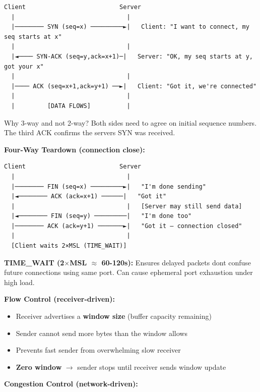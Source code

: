 \documentclass[11pt]{article}
\providecommand{\tightlist}{\setlength{\itemsep}{1pt}\setlength{\parskip}{0pt}}
\begin{document}
\setcodelang{}

\begin{verbatim}
Client                          Server
  |                               |
  |──────── SYN (seq=x) ─────────►|   Client: "I want to connect, my seq starts at x"
  |                               |
  |◄──── SYN-ACK (seq=y,ack=x+1)─|   Server: "OK, my seq starts at y, got your x"
  |                               |
  |──── ACK (seq=x+1,ack=y+1) ──►|   Client: "Got it, we're connected"
  |                               |
  |         [DATA FLOWS]          |
\end{verbatim}

Why 3-way and not 2-way? Both sides need to agree on initial sequence numbers. The third ACK confirms the server\textquotesingle s SYN was received.

\textbf{Four-Way Teardown (connection close):}

\setcodelang{}

\begin{verbatim}
Client                          Server
  |                               |
  |──────── FIN (seq=x) ─────────►|   "I'm done sending"
  |◄──────── ACK (ack=x+1) ──────|   "Got it"
  |                               |   [Server may still send data]
  |◄──────── FIN (seq=y) ─────────|   "I'm done too"
  |──────── ACK (ack=y+1) ───────►|   "Got it — connection closed"
  |                               |
  [Client waits 2×MSL (TIME_WAIT)]
\end{verbatim}

\textbf{TIME\_WAIT (2\(\times\)MSL \(\approx\) 60-120s):} Ensures delayed packets don\textquotesingle t confuse future connections using same port. Can cause ephemeral port exhaustion under high load.

\textbf{Flow Control (receiver-driven):}

\begin{itemize}
\tightlist
\item
  Receiver advertises a \textbf{window size} (buffer capacity remaining)
\item
  Sender cannot send more bytes than the window allows
\item
  Prevents fast sender from overwhelming slow receiver
\item
  \textbf{Zero window} \(\rightarrow\) sender stops until receiver sends window update
\end{itemize}

\textbf{Congestion Control (network-driven):}
\end{document}

